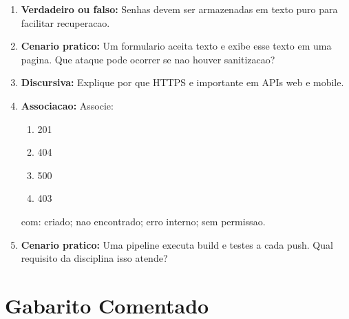 \documentclass[12pt,a4paper]{article}
\begin{document}
\begin{enumerate}
  \item \textbf{Verdadeiro ou falso:} Senhas devem ser armazenadas em texto puro para facilitar recuperacao.

  \item \textbf{Cenario pratico:} Um formulario aceita texto e exibe esse texto em uma pagina. Que ataque pode ocorrer se nao houver sanitizacao?

  \item \textbf{Discursiva:} Explique por que HTTPS e importante em APIs web e mobile.

  \item \textbf{Associacao:} Associe:
  \begin{enumerate}[label=\roman*)]
    \item 201
    \item 404
    \item 500
    \item 403
  \end{enumerate}
  com: criado; nao encontrado; erro interno; sem permissao.

  \item \textbf{Cenario pratico:} Uma pipeline executa build e testes a cada push. Qual requisito da disciplina isso atende?
\end{enumerate}

\section{Gabarito Comentado}
\end{document}
